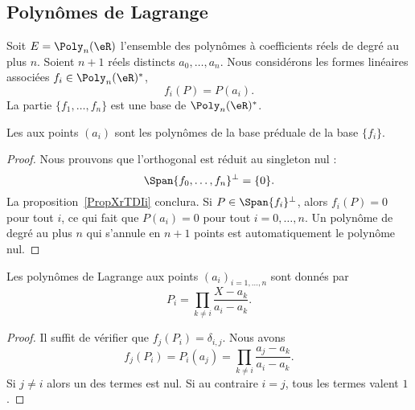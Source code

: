 \subsection{Polynômes de Lagrange}

\begin{lemmaDef}
    Soit \( E=\Poly_n(\eR)\) l'ensemble des polynômes à coefficients réels de degré au plus \( n\). Soient \( n+1\) réels distincts \( a_0,\ldots, a_n\). Nous considérons les formes linéaires associées \( f_i\in \Poly_n(\eR)^*\),
\begin{equation}
    f_i(P)=P(a_i).
\end{equation}
    La partie \( \{ f_1,\ldots, f_n \}\) est une base de \( \Poly_n(\eR)^*\).

    Les  aux points \( (a_i)\) sont les polynômes de la base préduale de la base \( \{ f_i \}\).
\end{lemmaDef}

\begin{proof}
    Nous prouvons que l'orthogonal est réduit au singleton nul :
    \begin{equation}
        \Span\{ f_0,\ldots, f_n \}^{\perp}=\{ 0 \}.
    \end{equation}
    La proposition~\ref{PropXrTDIi} conclura. Si \( P\in\Span\{ f_i \}^{\perp}\), alors \( f_i(P)=0\) pour tout \( i\), ce qui fait que \( P(a_i)=0\) pour tout \( i=0,\ldots, n\). Un polynôme de degré au plus \( n\) qui s'annule en \( n+1\) points est automatiquement le polynôme nul.
\end{proof}

\begin{proposition}
    Les polynômes de Lagrange aux points \( (a_i)_{i=1,\ldots, n}\) sont donnés par
    \begin{equation}
        P_i=\prod_{k\neq i}\frac{ X-a_k }{ a_i-a_k }.
    \end{equation}
\end{proposition}

\begin{proof}
    Il suffit de vérifier que \( f_j(P_i)=\delta_{i,j}\). Nous avons
    \begin{equation}
        f_j(P_i)=P_i(a_j)=\prod_{k\neq i}\frac{ a_j-a_k }{ a_i-a_k }.
    \end{equation}
    Si \( j\neq i\) alors un des termes est nul. Si au contraire \( i=j\), tous les termes valent \( 1\).
\end{proof}

